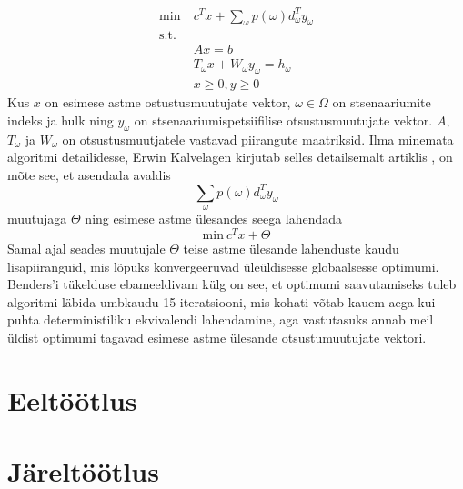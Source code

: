 \documentclass[10pt,a4paper]{article}
\begin{document}
\begin{align}
\textrm{min}\: & c^T x+ \sum_\omega p(\omega)d_\omega^T y_\omega \nonumber \\
\textrm{s.t.}             & \nonumber \\
&Ax = b \nonumber \\
&T_\omega x + W_\omega y_\omega = h_\omega \nonumber \\
& x \geq 0, y \geq 0 \nonumber
\end{align}
Kus $x$ on esimese astme ostustusmuutujate vektor, $\omega \in \Omega$ on stsenaariumite indeks ja hulk ning $y_\omega$ on stsenaariumi\-spetsiifilise otsustusmuutujate vektor. $A$, $T_\omega$ ja $W_\omega$ on otsustusmuutjatele vastavad piirangute maatriksid. Ilma minemata algoritmi detailidesse, Erwin Kalvelagen kirjutab selles detailsemalt artiklis \cite{Kalvelagen2014}, on mõte see, et asendada avaldis 
\begin{equation}
\sum_\omega p(\omega)d_\omega^T y_\omega \nonumber
\end{equation}
muutujaga $\Theta$ ning esimese astme ülesandes seega lahendada 
\begin{equation}
\textrm{min} \: c^T x+\Theta \nonumber
\end{equation}
Samal ajal seades muutujale $\Theta$ teise astme ülesande lahenduste kaudu lisapiiranguid, mis lõpuks konvergeeruvad üleüldisesse globaalsesse optimumi. Benders'i tükelduse ebameeldivam külg on see, et optimumi saavutamiseks tuleb algoritmi läbida umbkaudu 15 iteratsiooni, mis kohati võtab kauem aega kui puhta deterministiliku ekvivalendi lahendamine, aga vastutasuks annab meil üldist optimumi tagavad esimese astme ülesande otsustumuutujate vektori.


\section{Eeltöötlus}
\label{sec:eeltootlus}


\section{Järeltöötlus}
\label{sec:jareltootlus}


\appendix







{}
\end{document}
